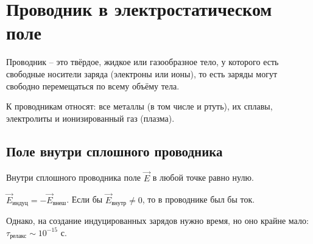 \chapter{Проводник в электростатическом поле}

    \begin{definition}
        Проводник -- это твёрдое, жидкое или газообразное тело, у которого есть 
        свободные носители заряда (электроны или ионы), то есть заряды могут 
        свободно перемещаться по всему объёму тела.
    \end{definition}

    К проводникам относят: все металлы (в том числе и ртуть), их сплавы, 
    электролиты и ионизированный газ (плазма).

\section{Поле внутри сплошного проводника}

    \begin{proposition}
        Внутри сплошного проводника поле \( \vec{E} \) в любой точке равно нулю.
    \end{proposition}

    \( \vec{E}_{\textit{индуц}} = -\vec{E}_{\textit{внеш}} \). Если бы
    \( \vec{E}_{\textit{внутр}} \neq 0 \), то в проводнике был бы ток.

    \begin{remark}
        Однако, на создание индуцированных зарядов нужно время, но оно крайне
        мало: \( \tau_{\textit{релакс}} \sim 10^{-15} \text{ с} \).
    \end{remark}

